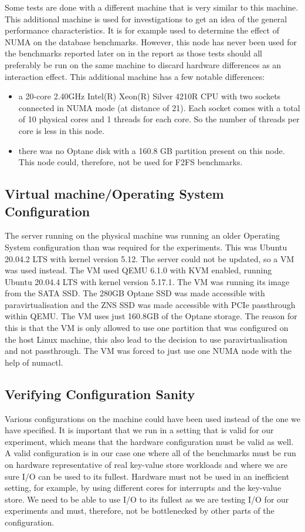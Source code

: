 Some tests are done with a different machine that is very similar to this machine. This additional machine is used for investigations to get an idea of the general performance characteristics. It is for example used to determine the effect of NUMA on the database benchmarks. However, this node has never been used for the benchmarks reported later on in the report as those tests should all preferably be run on the same machine to discard hardware differences as an interaction effect. This additional machine has a few notable differences:
\begin{itemize}
    \item a 20-core 2.40GHz Intel(R) Xeon(R) Silver 4210R CPU with two sockets connected in NUMA mode (at distance of 21). Each socket comes with a total of 10 physical cores and 1 threads for each core. So the number of threads per core is less in this node.
    \item there was no Optane disk with a 160.8 GB partition present on this node. This node could, therefore, not be used for F2FS benchmarks.
\end{itemize}

\subsection{Virtual machine/Operating System Configuration}
The server running on the physical machine was running an older Operating System configuration than was required for the experiments. This was Ubuntu 20.04.2 LTS with kernel version 5.12. The server could not be updated, so a VM was used instead. The VM used QEMU 6.1.0 with KVM enabled, running Ubuntu 20.04.4 LTS with kernel version 5.17.1. The VM was running its image from the SATA SSD. The 280GB Optane SSD was made accessible with paravirtualisation and the ZNS SSD was made accessible with PCIe passthrough within QEMU. The VM uses just 160.8GB of the Optane storage. The reason for this is that the VM is only allowed to use one partition that was configured on the host Linux machine, this also lead to the decision to use paravirtualisation and not passthrough. The VM was forced to just use one NUMA node with the help of numactl.

\subsection{Verifying Configuration Sanity}
Various configurations on the machine could have been used instead of the one we have specified. It is important that we run in a setting that is valid for our experiment, which means that the hardware configuration must be valid as well. A valid configuration is in our case one where all of the benchmarks must be run on hardware representative of real key-value store workloads and where we are sure I/O can be used to its fullest. Hardware must not be used in an inefficient setting, for example, by using different cores for interrupts and the key-value store. We need to be able to use I/O to its fullest as we are testing I/O for our experiments and must, therefore, not be bottlenecked by other parts of the configuration. 

